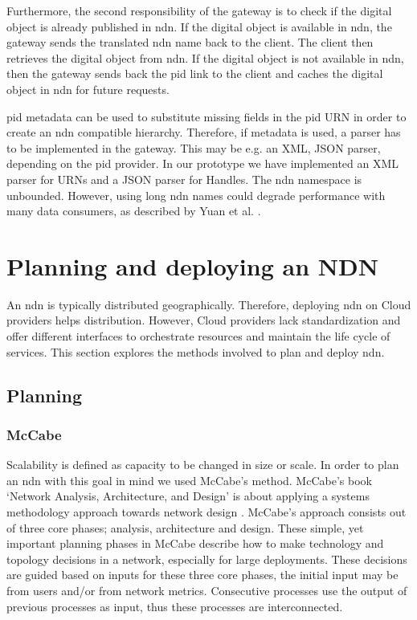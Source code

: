 \documentclass[conference]{IEEEtran}
\begin{document}
Furthermore, the second responsibility of the gateway is to check if the digital object is already published in \gls{ndn}. If the digital object is available in \gls{ndn}, the gateway sends the translated \gls{ndn} name back to the client. The client then retrieves the digital object from \gls{ndn}. If the digital object is not available in \gls{ndn}, then the gateway sends back the \gls{pid} link to the client and caches the digital object in \gls{ndn} for future requests.

\gls{pid} metadata can be used to substitute missing fields in the \gls{pid} URN in order to create an \gls{ndn} compatible hierarchy. Therefore, if metadata is used, a parser has to be implemented in the gateway. This may be e.g. an XML, JSON parser, depending on the \gls{pid} provider. In our prototype we have implemented an XML parser for URNs and a JSON parser for Handles. The \gls{ndn} namespace is unbounded. However, using long \gls{ndn} names could degrade performance with many data consumers, as described by Yuan et al. \cite{yuan2012scalable}.


\section{Planning and deploying an NDN}
\label{ndn-planning-deployment}
An \gls{ndn} is typically distributed geographically. Therefore, deploying \gls{ndn} on Cloud providers helps distribution. However, Cloud providers lack standardization and offer different interfaces to orchestrate resources and maintain the life cycle of services. This section explores the methods involved to plan and deploy \gls{ndn}.

\subsection{Planning}

\subsubsection{McCabe}
Scalability is defined as capacity to be changed in size or scale. In order to plan an \gls{ndn} with this goal in mind we used McCabe's method. McCabe's book `Network Analysis, Architecture, and Design' is about applying a systems methodology approach towards network design \cite{mccabe2010network}. McCabe's approach consists out of three core phases; analysis, architecture and design. These simple, yet important planning phases in McCabe describe how to make technology and topology decisions in a network, especially for large deployments. These decisions are guided based on inputs for these three core phases, the initial input may be from users and/or from network metrics. Consecutive processes use the output of previous processes as input, thus these processes are interconnected.
\end{document}
